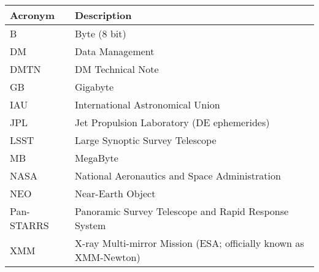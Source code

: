 \addtocounter{table}{-1}
\begin{longtable}{|l|p{}|}\hline
\textbf{Acronym} & \textbf{Description}  \\\hline

B & Byte (8 bit) \\\hline
DM & Data Management \\\hline
DMTN & DM Technical Note \\\hline
GB & Gigabyte \\\hline
IAU & International Astronomical Union \\\hline
JPL & Jet Propulsion Laboratory (DE ephemerides) \\\hline
LSST & Large Synoptic Survey Telescope \\\hline
MB & MegaByte \\\hline
NASA & National Aeronautics and Space Administration \\\hline
NEO & Near-Earth Object \\\hline
Pan-STARRS & Panoramic Survey Telescope and Rapid Response System \\\hline
XMM & X-ray Multi-mirror Mission (ESA; officially known as XMM-Newton) \\\hline
\end{longtable}
